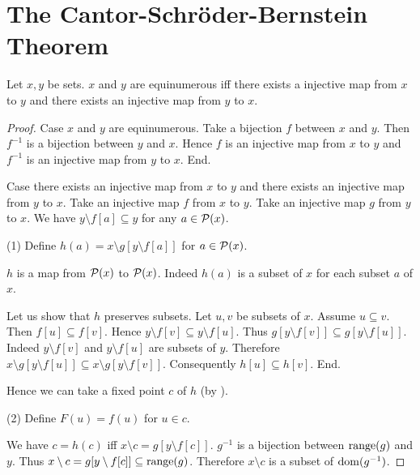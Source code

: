 \documentclass{article}
\begin{document}
  \section*{The Cantor-Schröder-Bernstein Theorem}

  \begin{forthel}
    \begin{theorem*}\label{cantor_schroeder_bernstein}
      Let $x,y$ be sets.
      $x$ and $y$ are equinumerous iff there exists a injective map from $x$ to $y$ and there exists an injective map from $y$ to $x$.
    \end{theorem*}
    \begin{proof}
      Case $x$ and $y$ are equinumerous.
        Take a bijection $f$ between $x$ and $y$.
        Then $f^{-1}$ is a bijection between $y$ and $x$.
        Hence $f$ is an injective map from $x$ to $y$ and $f^{-1}$ is an
        injective map from $y$ to $x$.
      End.

      Case there exists an injective map from $x$ to $y$ and there exists an injective map from $y$ to $x$.
        Take an injective map $f$ from $x$ to $y$.
        Take an injective map $g$ from $y$ to $x$.
        We have $y \setminus f[a] \subseteq y$ for any $a \in \mathcal{P}(x)$.

        (1) Define $h(a) = x \setminus g[y \setminus f[a]]$ for $a \in \mathcal{P}(x)$.

        $h$ is a map from $\mathcal{P}(x)$ to $\mathcal{P}(x)$.
        Indeed $h(a)$ is a subset of $x$ for each subset $a$ of $x$.

        Let us show that $h$ preserves subsets.
          Let $u, v$ be subsets of $x$.
          Assume $u \subseteq v$.
          Then $f[u] \subseteq f[v]$.
          Hence $y \setminus f[v] \subseteq y \setminus f[u]$.
          Thus $g[y \setminus f[v]] \subseteq g[y \setminus f[u]]$.
          Indeed $y \setminus f[v]$ and $y \setminus f[u]$ are subsets of $y$.
          Therefore $x \setminus g[y \setminus f[u]] \subseteq x \setminus g[y \setminus f[v]]$.
          Consequently $h[u] \subseteq h[v]$.
        End.

        Hence we can take a fixed point $c$ of $h$ (by ).

        (2) Define $F(u) = f(u)$ for $u \in c$.

        We have $c = h(c)$ iff $x \setminus c = g[y \setminus f[c]]$.
        $g^{-1}$ is a bijection between $\textrm{range}(g)$ and $y$.
        Thus $x \setminus c = g[y \setminus f[c]] \subseteq \textrm{range}(g)$.
        Therefore $x \setminus c$ is a subset of $\operatorname{dom}(g^{-1})$.


\end{proof}
\end{forthel}
\end{document}
